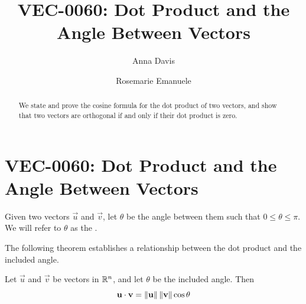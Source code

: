 \documentclass{ximera}
\author{Anna Davis \and Rosemarie Emanuele} \title{VEC-0060:  Dot Product and the Angle Between Vectors} \license{CC-BY 4.0}
\begin{document}
\begin{abstract}
 We state and prove the cosine formula for the dot product of two vectors, and show that two vectors are orthogonal if and only if their dot product is zero.
\end{abstract}
\maketitle

\section*{VEC-0060:  Dot Product and the Angle Between Vectors}

Given two vectors $\vec{u}$ and $\vec{v}$, let $\theta$ be the angle between them such that $0\leq\theta\leq \pi$.  We will refer to $\theta$ as the .

\begin{center}
\end{center}

The following theorem establishes a relationship between the dot product and the included angle.

  \begin{theorem}\label{th:dotproductcosine} Let $\vec{u}$ and $\vec{v}$ be vectors in $\mathbb{R}^n$, and let $\theta$ be the included angle.  Then
  \begin{equation*} \label{matlintrans}
 \mathbf{u}\cdot\mathbf{v}=\left\lVert\mathbf{u}\right\rVert\left\lVert\mathbf{v}\right\rVert\cos \theta
\end{equation*}
\end{theorem}
\end{document}
